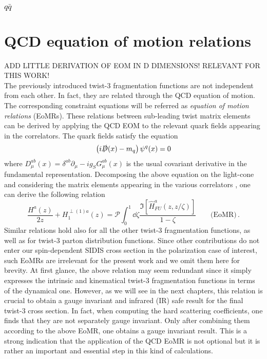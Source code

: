 \subsubsection*{$q \bar q$}
\section{QCD equation of motion relations}
\noindent ADD LITTLE DERIVATION OF EOM IN D DIMENSIONS! RELEVANT FOR THIS WORK!\\

The previously introduced twist-3 fragmentation functions are not independent from each other. In fact, they are related through the QCD equation of motion. The corresponding constraint equations will be referred as \textit{equation of motion relations} (EoMRs). These relations between sub-leading twist matrix elements can be derived by applying the QCD EOM to the relevant quark fields appearing in the correlators. The quark fields satisfy the equation
\begin{equation}
    \left(i \slashed{D}(x) -m_q \right)\psi^q(x)=0
\end{equation}
where $D_\mu^{ab}(x)=\delta^{ab}\partial_\mu -ig_S G_\mu^{ab}(x)$ is the usual covariant derivative in the fundamental representation. Decomposing the above equation on the light-cone and considering the matrix elements appearing in the various correlators \cite{bacchetta_semi-inclusive_2007}, one can derive the following relation \cite{kanazawa_operator_2016}
\begin{equation}
    \frac{H^a(z)}{2 z}+H_1^{\perp(1)a}(z)= \mathcal{P}\int_0^1\dd \zeta\frac{\Im[\hat H^a_{FU}(z,z/\zeta)]}{1-\zeta}\qquad \text{(EoMR)}\,.
\end{equation}
Similar relations hold also for all the other twist-3 fragmentation functions, as well as for twist-3 parton distribution functions. Since other contributions do not enter our spin-dependent SIDIS cross section in the polarization case of interest, such EoMRs are irrelevant for the present work and we omit them here for brevity. At first glance, the above relation may seem redundant since it simply expresses the intrinsic and kinematical twist-3 fragmentation functions in terms of the dynamical one. However, as we will see in the next chapters, this relation is crucial to obtain a gauge invariant and infrared (IR) safe result for the final twist-3 cross section. In fact, when computing the hard scattering coefficients, one finds that they are not separately gauge invariant. Only after combining them according to the above EoMR, one obtains a gauge invariant result. This is a strong indication that the application of the QCD EoMR is not optional but it is rather an important and essential step in this kind of calculations.

